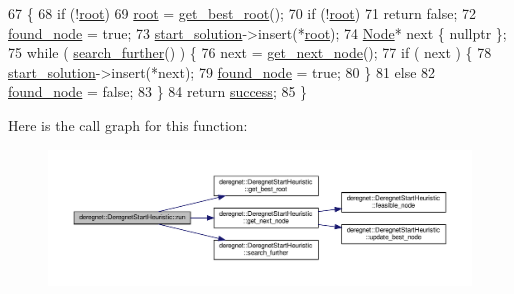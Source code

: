 \begin{DoxyCode}
67                                  \{
68     \textcolor{keywordflow}{if} (!\hyperlink{classderegnet_1_1DeregnetStartHeuristic_a4605d41352e3adf1f9f9f32466a4e61e}{root})
69         \hyperlink{classderegnet_1_1DeregnetStartHeuristic_a4605d41352e3adf1f9f9f32466a4e61e}{root} = \hyperlink{classderegnet_1_1DeregnetStartHeuristic_a372be86d0fb8ac94bd926a1f4d09e102}{get\_best\_root}();
70     \textcolor{keywordflow}{if} (!\hyperlink{classderegnet_1_1DeregnetStartHeuristic_a4605d41352e3adf1f9f9f32466a4e61e}{root})
71         \textcolor{keywordflow}{return} \textcolor{keyword}{false};
72     \hyperlink{classderegnet_1_1DeregnetStartHeuristic_a1ca705794583fb3b6e563efeceb4445e}{found\_node} = \textcolor{keyword}{true};
73     \hyperlink{classderegnet_1_1DeregnetStartHeuristic_a7450e11ca0a265b055f95e7832b65e2f}{start\_solution}->insert(*\hyperlink{classderegnet_1_1DeregnetStartHeuristic_a4605d41352e3adf1f9f9f32466a4e61e}{root});
74     \hyperlink{namespacederegnet_a744bad34f2de9856d36715a445f027f3}{Node}* next \{ \textcolor{keyword}{nullptr} \};
75     \textcolor{keywordflow}{while} ( \hyperlink{classderegnet_1_1DeregnetStartHeuristic_ac3ee2c3022512f9d4ec7a6b49358e60a}{search\_further}() ) \{
76         next = \hyperlink{classderegnet_1_1DeregnetStartHeuristic_a6ec478444151e54625951f858ff76761}{get\_next\_node}();
77         \textcolor{keywordflow}{if} ( next ) \{
78             \hyperlink{classderegnet_1_1DeregnetStartHeuristic_a7450e11ca0a265b055f95e7832b65e2f}{start\_solution}->insert(*next);
79             \hyperlink{classderegnet_1_1DeregnetStartHeuristic_a1ca705794583fb3b6e563efeceb4445e}{found\_node} = \textcolor{keyword}{true};
80         \}
81         \textcolor{keywordflow}{else}
82             \hyperlink{classderegnet_1_1DeregnetStartHeuristic_a1ca705794583fb3b6e563efeceb4445e}{found\_node} = \textcolor{keyword}{false};
83     \}
84     \textcolor{keywordflow}{return} \hyperlink{classderegnet_1_1DeregnetStartHeuristic_a72fd16ee027f6aa973f1ff29746addba}{success};
85 \}
\end{DoxyCode}
Here is the call graph for this function\+:\nopagebreak
\begin{figure}[H]
\begin{center}
\leavevmode
\includegraphics[width=350pt]{classderegnet_1_1DeregnetStartHeuristic_aa2afcafa3d3838a7e7b05faf586954e8_cgraph}
\end{center}
\end{figure}
\mbox{\label{classderegnet_1_1DeregnetStartHeuristic_ac3ee2c3022512f9d4ec7a6b49358e60a}} 
